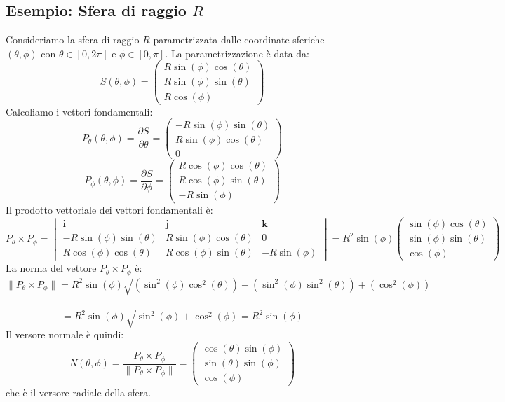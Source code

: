 \subsection{Esempio: Sfera di raggio $R$}
  Consideriamo la sfera di raggio $R$ parametrizzata dalle coordinate sferiche $(\theta, \phi)$ con $\theta \in [0, 2\pi]$ e $\phi \in [0, \pi]$. La parametrizzazione è data da:
  \[
  S(\theta, \phi) = \begin{pmatrix}
    R \sin(\phi) \cos(\theta) \\
    R \sin(\phi) \sin(\theta) \\
    R \cos(\phi)
  \end{pmatrix}
  \]
  Calcoliamo i vettori fondamentali:
  \[
  P_\theta(\theta, \phi) = \frac{\partial S}{\partial \theta} = \begin{pmatrix}
    -R \sin(\phi) \sin(\theta) \\
    R \sin(\phi) \cos(\theta) \\
    0
  \end{pmatrix}
  \]
  \[
  P_\phi(\theta, \phi) = \frac{\partial S}{\partial \phi} = \begin{pmatrix}
    R \cos(\phi) \cos(\theta) \\
    R \cos(\phi) \sin(\theta) \\
    -R \sin(\phi)
  \end{pmatrix}
  \]
  Il prodotto vettoriale dei vettori fondamentali è:
  \[
  P_\theta \times P_\phi = \begin{vmatrix}
    \mathbf{i} & \mathbf{j} & \mathbf{k} \\
    -R \sin(\phi) \sin(\theta) & R \sin(\phi) \cos(\theta) & 0 \\
    R \cos(\phi) \cos(\theta) & R \cos(\phi) \sin(\theta) & -R \sin(\phi)
  \end{vmatrix}
  = R^2 \sin(\phi) \begin{pmatrix}
    \sin(\phi)\cos(\theta) \\
    \sin(\phi)\sin(\theta) \\
    \cos(\phi)
  \end{pmatrix}
  \]
  La norma del vettore $P_\theta \times P_\phi$ è:
  \[
  \|P_\theta \times P_\phi\| = R^2 \sin(\phi) \sqrt{(\sin^2(\phi) \cos^2(\theta)) + ( \sin^2(\phi) \sin^2(\theta)) + (\cos^2(\phi))}
  \]\\
  \[ = R^2 \sin(\phi) \sqrt{\sin^2(\phi) + \cos^2(\phi)}
  = R^2 \sin(\phi)
  \]
  Il versore normale è quindi:
  \[
  N(\theta, \phi) = \frac{P_\theta \times P_\phi}{\|P_\theta \times P_\phi\|} = \begin{pmatrix}
    \cos(\theta) \sin(\phi) \\
    \sin(\theta) \sin(\phi) \\
    \cos(\phi)
  \end{pmatrix}
  \]
  che è il versore radiale della sfera.

